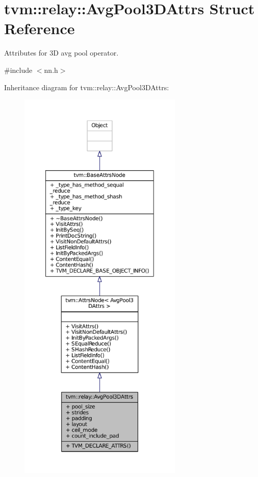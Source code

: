 \hypertarget{structtvm_1_1relay_1_1AvgPool3DAttrs}{}\section{tvm\+:\+:relay\+:\+:Avg\+Pool3\+D\+Attrs Struct Reference}
\label{structtvm_1_1relay_1_1AvgPool3DAttrs}


Attributes for 3D avg pool operator.  




{\ttfamily \#include $<$nn.\+h$>$}



Inheritance diagram for tvm\+:\+:relay\+:\+:Avg\+Pool3\+D\+Attrs\+:
\nopagebreak
\begin{figure}[H]
\begin{center}
\leavevmode
\includegraphics[height=550pt]{structtvm_1_1relay_1_1AvgPool3DAttrs__inherit__graph}
\end{center}
\end{figure}


